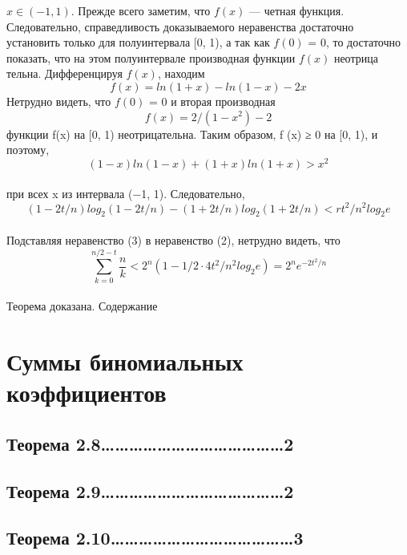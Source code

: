 \documentclass[a4paper,12pt]{article}
\begin{document}
$x
∈ (−1, 1).$ Прежде всего заметим, что
$f(x)$ — четная функция. Следовательно, справедливость доказываемого неравенства достаточно установить только для полуинтервала [0, 1), а так как
$f(0)$ = 0, то достаточно
показать, что на этом полуинтервале производная функции
$f(x)$ неотрица
тельна. Дифференцируя
$f(x)$, находим
$$f(x)=ln(1+x)-ln(1-x)-2x$$
Нетрудно видеть, что
$f(0)$ = 0 и вторая производная
$$f(x)=2/(1-x^2)-2$$
функции
f(x) на [0, 1) неотрицательна. Таким образом,
f
(x) ≥ 0 на [0, 1),
и поэтому,
$$(1-x)ln(1-x)+(1+x)ln(1+x)>x^2$$
\\при всех
x из интервала (−1, 1). Следовательно,
\begin{equation}
(1-2t/n)log_2(1-2t/n)-(1+2t/n)log_2(1+2t/n)<rt^2/n^2log_2e
\end{equation}
\\Подставляя неравенство (3) в неравенство (2), нетрудно видеть,
что
$$\sum_{k=0}^{n/2-t} \frac{n}{k}<2^n(1-1/2\cdot4t^2/n^2log_2e)=2^ne^{-2t^2/n}$$
\\Теорема доказана.
\newpage
Содержание
\section{Суммы биномиальных коэффициентов}
\subsection{Теорема 2.8\ldots\ldots\ldots\ldots\ldots\ldots\ldots\ldots\ldots\ldots\ldots\ldots\ldots2}
\subsection{Теорема 2.9\ldots\ldots\ldots\ldots\ldots\ldots\ldots\ldots\ldots\ldots\ldots\ldots\ldots2}
\subsection{Теорема 2.10\ldots\ldots\ldots\ldots\ldots\ldots\ldots\ldots\ldots\ldots\ldots\ldots\ldots3}
\end{document}
